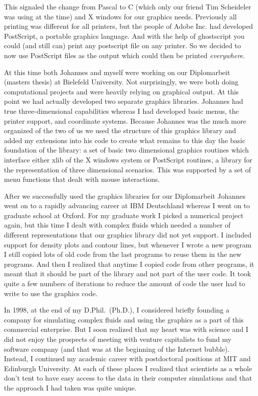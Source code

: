 \documentclass[12pt,letterpaper]{article}
\begin{document}
This signaled the change from Pascal to C (which only our friend Tim
Scheideler was using at the time) and X windows for our graphics
needs. Previously all printing was different for all printers, but the
people of Adobe Inc. had developed PostScript, a portable graphics
language. And with the help of ghostscript you could (and still can)
print any postscript file on any printer. So we decided to now use
PostScript files as the output which could then be printed
\textit{everywhere}. 

At this time both Johannes and myself were working on our
Diplomarbeit (masters thesis) at Bielefeld University. Not
surprisingly, we were both doing computational projects and were
heavily relying on graphical output. At this point we had
actually developed two separate graphics libraries. Johannes had true
three-dimensional capabilities whereas I had developed basic menus,
the printer support, and coordinate systems. Because Johannes was the
much more organized of the two of us we used the structure of this
graphics library and added my extensions into his code to create what
remains to this day the basic foundation of the library: a set of
basic two dimensional graphics routines which interface either xlib of
the X windows system or PostScript routines, a library for the
representation of three dimensional scenarios. This was supported by a
set of menu functions that dealt with mouse interactions.

After we successfully used the graphics libraries for our Diplomarbeit
Johannes went on to a rapidly advancing career at IBM Deutschland
whereas I went on to graduate school at Oxford. For my graduate work
I picked a numerical project again, but this time I dealt with complex
fluids which needed a number of different representations that our
graphics library did not yet support. I included support for density
plots and contour lines, but whenever I wrote a new program I still
copied lots of old code from the last programs to reuse them in the
new programs. And then I realized that anytime I copied code from other
programs, it meant that it should be part of the library and not part
of the user code. It took quite a few numbers of iterations to reduce
the amount of code the user had to write to use the graphics code. 

In 1998, at the end of my D.Phil.~(Ph.D.), I considered briefly
founding a company for simulating complex fluids and using the
graphics as a part of this commercial enterprise. But I soon realized
that my heart was with science and I did not enjoy the prospects of
meeting with venture capitalists to fund my software company (and that
was at the beginning of the Internet bubble). Instead, I continued my
academic career with postdoctoral positions at MIT and Edinburgh
University. At each of these places I realized that scientists as a
whole don't tent to have easy access to the data in their computer
simulations and that the approach I had taken was quite unique.
\end{document}
